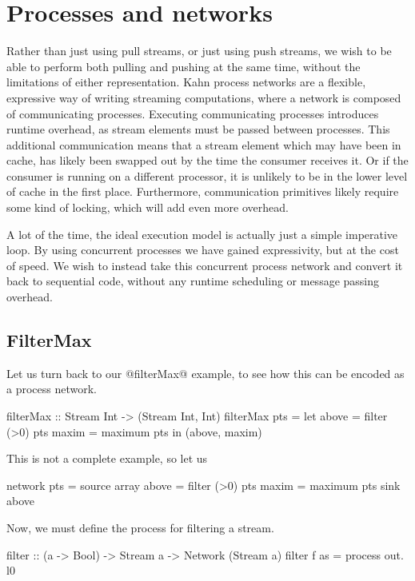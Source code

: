 \chapter{Processes and networks}
\label{chapter:process:processes}

Rather than just using pull streams, or just using push streams, we wish to be able to perform both pulling and pushing at the same time, without the limitations of either representation.
Kahn process networks \citep{kahn1976coroutines} are a flexible, expressive way of writing streaming computations, where a network is composed of communicating processes.
Executing communicating processes introduces runtime overhead, as stream elements must be passed between processes. This additional communication means that a stream element which may have been in cache, has likely been swapped out by the time the consumer receives it. Or if the consumer is running on a different processor, it is unlikely to be in the lower level of cache in the first place.
Furthermore, communication primitives likely require some kind of locking, which will add even more overhead.

A lot of the time, the ideal execution model is actually just a simple imperative loop.
By using concurrent processes we have gained expressivity, but at the cost of speed.
We wish to instead take this concurrent process network and convert it back to sequential code, without any runtime scheduling or message passing overhead.

\section{FilterMax}
Let us turn back to our @filterMax@ example, to see how this can be encoded as a process network.

\begin{code}
filterMax :: Stream Int -> (Stream Int, Int)
filterMax pts
 = let above = filter (>0) pts
       maxim = maximum     pts
   in (above, maxim)
\end{code}

This is not a complete example, so let us 

\begin{code}
network
  pts = source array
  above = filter (>0) pts
  maxim = maximum     pts
  sink above
\end{code}

Now, we must define the process for filtering a stream.
\begin{code}
filter :: (a -> Bool) -> Stream a -> Network (Stream a)
filter f as = process out.
  l0
\end{code}


